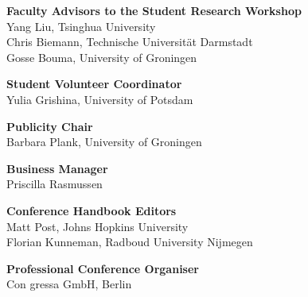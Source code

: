 {\bf Faculty Advisors to the Student Research Workshop} \\
Yang Liu, Tsinghua University \\
Chris Biemann, Technische Universität Darmstadt \\
Gosse Bouma, University of Groningen 

{\bf Student Volunteer Coordinator} \\
Yulia Grishina, University of Potsdam

{\bf Publicity Chair} \\
Barbara Plank, University of Groningen

{\bf Business Manager} \\
Priscilla Rasmussen

{\bf Conference Handbook Editors} \\
Matt Post, Johns Hopkins University \\
Florian Kunneman, Radboud University Nijmegen

{\bf Professional Conference Organiser} \\
Con gressa GmbH, Berlin
